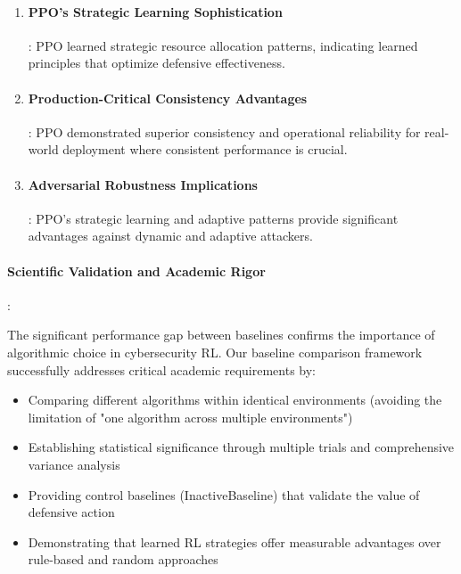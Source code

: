 \documentclass[12pt,oneside]{article}
\begin{document}
\begin{enumerate}
\item \paragraph{PPO's Strategic Learning Sophistication}: PPO learned strategic resource allocation patterns, indicating learned principles that optimize defensive effectiveness.

\item \paragraph{Production-Critical Consistency Advantages}: PPO demonstrated superior consistency and operational reliability for real-world deployment where consistent performance is crucial.

\item \paragraph{Adversarial Robustness Implications}: PPO's strategic learning and adaptive patterns provide significant advantages against dynamic and adaptive attackers.
\end{enumerate}

\paragraph{Scientific Validation and Academic Rigor}:

The significant performance gap between baselines confirms the importance of algorithmic choice in cybersecurity RL. Our baseline comparison framework successfully addresses critical academic requirements by:
\begin{itemize}
\item Comparing different algorithms within identical environments (avoiding the limitation of "one algorithm across multiple environments")
\item Establishing statistical significance through multiple trials and comprehensive variance analysis
\item Providing control baselines (InactiveBaseline) that validate the value of defensive action
\item Demonstrating that learned RL strategies offer measurable advantages over rule-based and random approaches
\end{itemize}
\end{document}
